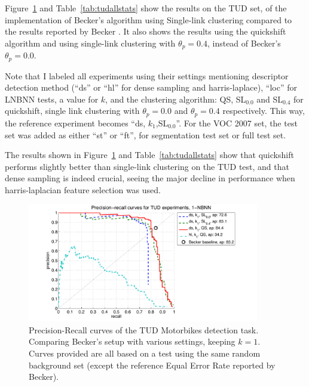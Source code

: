 Figure~\ref{fig:tudk1prc} and Table~\ref{tab:tudallstats} show the results on the TUD set, of the implementation of Becker's algorithm using Single-link clustering compared to the results reported by Becker \cite{becker2012codebook}. It also shows the results using the quickshift algorithm and using single-link clustering with $\theta_p = 0.4$, instead of Becker's $\theta_p = 0.0$. 

Note that I labeled all experiments using their settings mentioning descriptor detection method (``ds'' or ``hl'' for dense sampling and harris-laplace), ``loc'' for LNBNN tests, a value for $k$, and the clustering algorithm: QS, SL$_{0.0}$ and SL$_{0.4}$ for quickshift, single link clustering with $\theta_p=0.0$ and $\theta_p=0.4$ respectively. This way, the reference experiment becomes ``ds, $k_1$,SL$_{0.0}$''. For the VOC 2007 set, the test set was added as either ``st'' or ``ft'', for segmentation test set or full test set.

The results shown in Figure~\ref{fig:tudk1prc} and Table~\ref{tab:tudallstats} show that quickshift performs slightly better than single-link clustering on the TUD test, and that dense sampling is indeed crucial, seeing the major decline in performance when harris-laplacian feature selection was used.

\begin{figure}[hbt]
    \centering
    \includegraphics[width=0.9\textwidth]{TUDk1prc}
    \caption{Precision-Recall curves of the TUD Motorbikes detection task. Comparing Becker's \cite{becker2012codebook} setup with various settings, keeping $k=1$. Curves provided are all based on a test using the same random background set (except the reference Equal Error Rate reported by Becker).}
    \label{fig:tudk1prc}
\end{figure}

